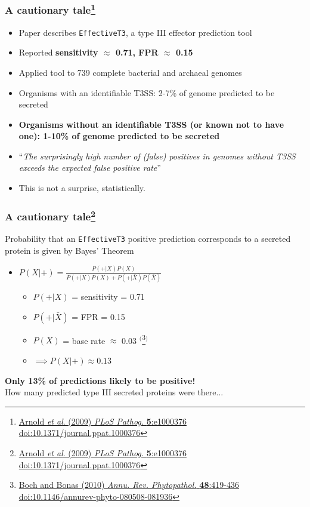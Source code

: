 \begin{frame}
  \frametitle{A cautionary tale\footnote{\tiny{\href{http://dx.doi.org/10.1371/journal.ppat.1000376}{Arnold \textit{et al}. (2009) \textit{PLoS Pathog.} \textbf{5}:e1000376 doi:10.1371/journal.ppat.1000376}}}}
  \begin{itemize}
    \item<1-> Paper describes \texttt{EffectiveT3}, a type III effector prediction tool
    \item<1-> Reported \textbf{sensitivity $\approx$ 0.71, FPR $\approx$ 0.15}
    \item<1-> Applied tool to 739 complete bacterial and archaeal genomes
    \item<2-> Organisms with an identifiable T3SS: 2-7\% of genome predicted to be secreted
    \item<2-> \textbf{Organisms without an identifiable T3SS (or known not to have one): 1-10\% of genome predicted to be secreted}
    \item<2-> ``\textit{The surprisingly high number of (false) positives in genomes without T3SS exceeds the expected false positive rate}''
    \item<2-> This is not a surprise, statistically.
  \end{itemize} 
\end{frame}

\begin{frame}
  \frametitle{A cautionary tale\footnote{\tiny{\href{http://dx.doi.org/10.1371/journal.ppat.1000376}{Arnold \textit{et al}. (2009) \textit{PLoS Pathog.} \textbf{5}:e1000376 doi:10.1371/journal.ppat.1000376}}}}
    Probability that an \texttt{EffectiveT3} positive prediction corresponds to a secreted protein is given by Bayes' Theorem \\[0.2cm]
    \begin{itemize}
      \item $P(X|+) =  \frac{P(+|X) P(X)}{P(+|X) P(X) + P(+|\bar{X}) P(\bar{X})}$
      \begin{itemize}
        \item $P(+|X)$ = sensitivity = 0.71
        \item $P(+|\bar{X})$ = FPR = 0.15
        \item $P(X)$ = base rate $\approx$ 0.03 $^($\footnote{\tiny{\href{http://dx.doi.org/10.1146/annurev-phyto-080508-081936}{Boch and Bonas (2010) \textit{Annu. Rev. Phytopathol.} \textbf{48}:419-436 doi:10.1146/annurev-phyto-080508-081936}}}$^)$
        \item $\implies P(X|+) \approx 0.13$
      \end{itemize}
    \end{itemize}
  \textbf{Only 13\% of predictions likely to be positive!}\\[0.1cm]
  How many predicted type III secreted proteins were there$\ldots$
\end{frame}

